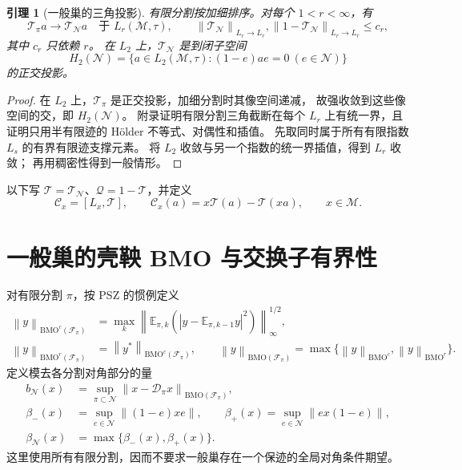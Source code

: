 \documentclass[UTF8,11pt,a4paper,fontset=fandol]{ctexart}
\newtheorem{lemma}[theorem]{引理}
\theoremstyle{remark}
\numberwithin{equation}{section}
\newcommand{\M}{\mathcal M}
\newcommand{\N}{\mathcal N}
\newcommand{\T}{\mathcal T}
\newcommand{\Q}{\mathcal Q}
\newcommand{\D}{\mathcal D}
\newcommand{\CC}{\mathcal C}
\newcommand{\E}{\mathbb E}
\newcommand{\norm}[1]{\left\lVert #1\right\rVert}
\begin{document}
\begin{lemma}[一般巢的三角投影]\label{lem:triangle}
有限分割按加细排序。对每个 $1<r<\infty$，有
\[
 \T_\pi a\longrightarrow\T_\N a\quad\text{于 }L_r(\M,\tau),
 \qquad
 \norm{\T_\N}_{L_r\to L_r},\norm{1-\T_\N}_{L_r\to L_r}\leq c_r,
\]
其中 $c_r$ 只依赖 $r$。
在 $L_2$ 上，$\T_\N$ 是到闭子空间
\[
 H_2(\N)=\{a\in L_2(\M,\tau):(1-e)ae=0\ (e\in\N)\}
\]
的正交投影。
\end{lemma}

\begin{proof}
在 $L_2$ 上，$\T_\pi$ 是正交投影，加细分割时其像空间递减，
故强收敛到这些像空间的交，即 $H_2(\N)$。
附录证明有限分割三角截断在每个 $L_r$ 上有统一界，且证明只用半有限迹的
H\"older 不等式、对偶性和插值。
先取同时属于所有有限指数 $L_s$ 的有界有限迹支撑元素。
将 $L_2$ 收敛与另一个指数的统一界插值，得到 $L_r$ 收敛；
再用稠密性得到一般情形。
\end{proof}

以下写 $\T=\T_\N$、$\Q=1-\T$，并定义
\[
 \CC_x=[L_x,\T],\qquad \CC_x(a)=x\T(a)-\T(xa),\qquad x\in\M.
\]

\section{一般巢的壳鞅 BMO 与交换子有界性}

对有限分割 $\pi$，按 PSZ 的惯例定义
\begin{align*}
 \norm y_{\mathrm{BMO}^c(\mathcal F_\pi)}
 &=\max_k\norm{\E_{\pi,k}(|y-\E_{\pi,k-1}y|^2)}_\infty^{1/2},\\
 \norm y_{\mathrm{BMO}^r(\mathcal F_\pi)}
 &=\norm{y^*}_{\mathrm{BMO}^c(\mathcal F_\pi)},
 \qquad
 \norm y_{\mathrm{BMO}(\mathcal F_\pi)}
 =\max\{\norm y_{\mathrm{BMO}^c},\norm y_{\mathrm{BMO}^r}\}.
\end{align*}
定义模去各分割对角部分的量
\begin{align}
 b_\N(x)&=\sup_{\pi\subset\N}
       \norm{x-\D_\pi x}_{\mathrm{BMO}(\mathcal F_\pi)},\label{eq:bmo}\\
 \beta_-(x)&=\sup_{e\in\N}\norm{(1-e)xe},\qquad
 \beta_+(x)=\sup_{e\in\N}\norm{ex(1-e)},\label{eq:beta}\\
 \beta_\N(x)&=\max\{\beta_-(x),\beta_+(x)\}.
\end{align}
这里使用所有有限分割，因而不要求一般巢存在一个保迹的全局对角条件期望。
\end{document}
